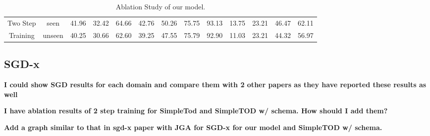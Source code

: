 \begin{table}
\begin{adjustbox}{max width=\textwidth}
\begin{tabular}{|c|c|c|c|c|c|c|c|c|c|c|c|c|}
            {Two Step}             & seen    & 41.96    & 32.42    & 64.66          & 42.76          & 50.26          & 75.75                     & 93.13     & 13.75                     & 23.21                     & 46.47   & 62.11    \\
            {Training}             & unseen  & 40.25    & 30.66    & 62.60          & 39.25          & 47.55          & 75.79                     & 92.90     & 11.03                     & 23.21                     & 44.32   & 56.97    \\ \hline
        \end{tabular}
    \end{adjustbox}
    \caption{Ablation Study of our model.}
    \label{tab:ablation-results}
\end{table}




\subsection{SGD-x}
\textbf{I could show SGD results for each domain and compare them with 2 other papers as they have reported these results as well}

\textbf{I have ablation results of 2 step training for SimpleTod and SimpleTOD w/ schema. How should I add them?}

\textbf{Add a graph similar to that in sgd-x paper with JGA for SGD-x for our model and SimpleTOD w/ schema. }



